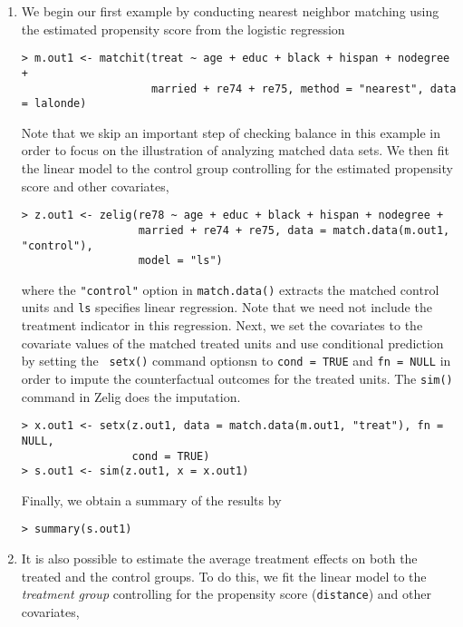 \begin{enumerate}
\item We begin our first example by conducting nearest neighbor
  matching using the estimated propensity score from the logistic
  regression
\begin{verbatim}
> m.out1 <- matchit(treat ~ age + educ + black + hispan + nodegree + 
                    married + re74 + re75, method = "nearest", data = lalonde)
\end{verbatim}
  Note that we skip an important step of checking balance in this
  example in order to focus on the illustration of analyzing matched
  data sets. We then fit the linear model to the control group
  controlling for the estimated propensity score and other covariates,
\begin{verbatim}
> z.out1 <- zelig(re78 ~ age + educ + black + hispan + nodegree + 
                  married + re74 + re75, data = match.data(m.out1, "control"), 
                  model = "ls")
\end{verbatim}
  where the {\tt "control"} option in {\tt match.data()} extracts the
  matched control units and {\tt ls} specifies linear regression. Note
  that we need not include the treatment indicator in this regression.
  Next, we set the covariates to the covariate values of the matched
  treated units and use conditional prediction by setting the {\tt
    setx()} command optionsn to {\tt cond = TRUE} and {\tt fn = NULL}
  in order to impute the counterfactual outcomes for the treated
  units. The {\tt sim()} command in Zelig does the imputation.
\begin{verbatim}
> x.out1 <- setx(z.out1, data = match.data(m.out1, "treat"), fn = NULL, 
                 cond = TRUE)
> s.out1 <- sim(z.out1, x = x.out1)
\end{verbatim}
Finally, we obtain a summary of the results by 
\begin{verbatim}
> summary(s.out1)
\end{verbatim}

\item It is also possible to estimate the average treatment effects on
  both the treated and the control groups. To do this, we fit the
  linear model to the {\it treatment group} controlling for the
  propensity score ({\tt distance}) and other covariates,


\end{enumerate}
